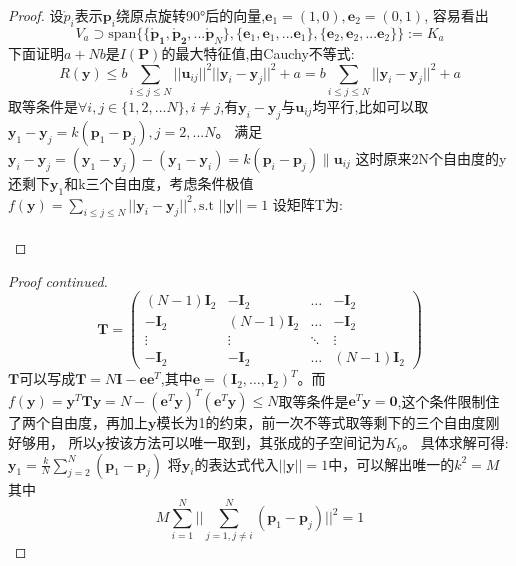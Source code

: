 \documentclass[notheorems,xetex,mathserif,serif]{beamer}
\begin{document}
\begin{frame}
\begin{proof}
设$\mathring{p}_i$表示$\bm{p}_i$绕原点旋转90°后的向量,$\bm{e}_1=(1,0),\bm{e}_2=(0,1)$,
容易看出
\[
V_a \supset\text{span}\{\{\bm{\mathring{p}_1},\bm{\mathring{p}_2},...\bm{\mathring{p}} _N\},\{\bm{e}_1,\bm{e}_1,...\bm{e}_1\},\{\bm{e}_2,\bm{e}_2,...\bm{e}_2\}\}:=K_a
\]
下面证明$a+Nb$是$I(\bm{P})$的最大特征值,由Cauchy不等式:
\begin{equation}
R(\bm{y})\leq b\sum_{i\leq j\leq N} ||\bm{u}_{ij}||^2||\bm{y}_i-\bm{y}_j||^2+a=b\sum_{i\leq j\leq N}||\bm{y}_i-\bm{y}_j||^2+a
\end{equation}
取等条件是$\forall i,j\in \{1,2,...N\},i\neq j$,有$\bm{y}_i-\bm{y}_j$与$\bm{u}_{ij}$均平行,比如可以取
$\bm{y}_1-\bm{y}_j=k(\bm{p}_1-\bm{p}_j),j=2,...N$。
满足
$\bm{y}_i-\bm{y}_j=(\bm{y}_1-\bm{y}_j)-(\bm{y}_1-\bm{y}_i)
=k(\bm{p}_i-\bm{p}_j)\parallel \bm{u}_{ij}$
这时原来2N个自由度的y还剩下$\bm{y}_1$和k三个自由度，考虑条件极值
$f(\bm{y})=\sum_{i\leq j\leq N} ||\bm{y}_i-\bm{y}_j||^2,\text{s.t } ||\bm{y}||=1$
设矩阵T为:
\\
\qquad\\
\end{proof}
\end{frame}
\begin{frame}
\begin{proof}[Proof continued]
\[
\bm{T}=\left(
\begin{array}{cccc}
(N-1)\bm{I}_2&-\bm{I}_2&\dots&-\bm{I}_2\\
-\bm{I}_2&(N-1)\bm{I}_2&\dots&-\bm{I}_2\\
\vdots & \vdots & \ddots & \vdots\\
-\bm{I}_2& -\bm{I}_2 & \dots & (N-1)\bm{I}_2
\end{array}
\right)
\]
$\bm{T}$可以写成$\bm{T}=N\bm{I}-\bm{e}\bm{e}^T$,其中$\bm{e}=(\bm{I}_2,\dots,\bm{I}_2)^T$。而$f(\bm{y})=\bm{y}^T\bm{T}\bm{y}=N-(\bm{e}^T\bm{y})^T(\bm{e}^T\bm{y})\leq N$取等条件是$\bm{e}^T\bm{y}=\bm{0}$,这个条件限制住了两个自由度，再加上$\bm{y}$模长为1的约束，前一次不等式取等剩下的三个自由度刚好够用，
所以$\bm{y}$按该方法可以唯一取到，其张成的子空间记为$K_b$。
具体求解可得:
$\bm{y}_1=\frac{k}{N}\sum_{j=2}^N (\bm{p}_1-\bm{p}_j)$
将$\bm{y}_i$的表达式代入$||\bm{y}||=1$中，可以解出唯一的$k^2=M$
其中
\vspace{-2mm}
\[
M\sum_{i=1}^N||\sum_{j=1,j\neq i}^N(\bm{p}_1-\bm{p}_j)||^2=1
\]
\end{proof}
\end{frame}
\end{document}

